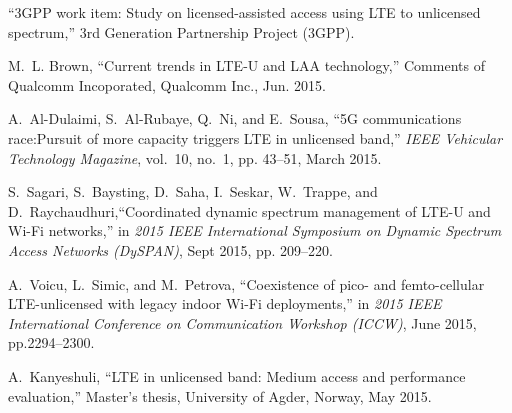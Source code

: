 %
%

\begin{thebibliography}{99.}%
``{3GPP} work item: Study on licensed-assisted access using {LTE} to unlicensed spectrum,'' 3rd Generation Partnership Project (3GPP).

M.~L. Brown, ``Current trends in {LTE-U} and {LAA} technology,'' Comments of Qualcomm Incoporated, Qualcomm Inc., Jun. 2015.

A.~Al-Dulaimi, S.~Al-Rubaye, Q.~Ni, and E.~Sousa, ``{5G} communications race:Pursuit of more capacity triggers {LTE} in unlicensed band,'' \emph{IEEE Vehicular Technology Magazine}, vol.~10, no.~1, pp. 43--51, March 2015.

 S.~Sagari, S.~Baysting, D.~Saha, I.~Seskar, W.~Trappe, and D.~Raychaudhuri,``Coordinated dynamic spectrum management of {LTE-U} and {Wi-Fi} networks,''
in \emph{2015 IEEE International Symposium on Dynamic Spectrum Access Networks (DySPAN)}, Sept 2015, pp. 209--220.

A.~Voicu, L.~Simic, and M.~Petrova, ``Coexistence of pico- and femto-cellular {LTE}-unlicensed with legacy indoor {Wi-Fi} deployments,'' in \emph{2015 IEEE	International Conference on Communication Workshop (ICCW)}, June 2015, pp.2294--2300.

A.~Kanyeshuli, ``{LTE} in unlicensed band: Medium access and performance evaluation,'' Master's thesis, University of Agder, Norway, May 2015.
\end{thebibliography}
